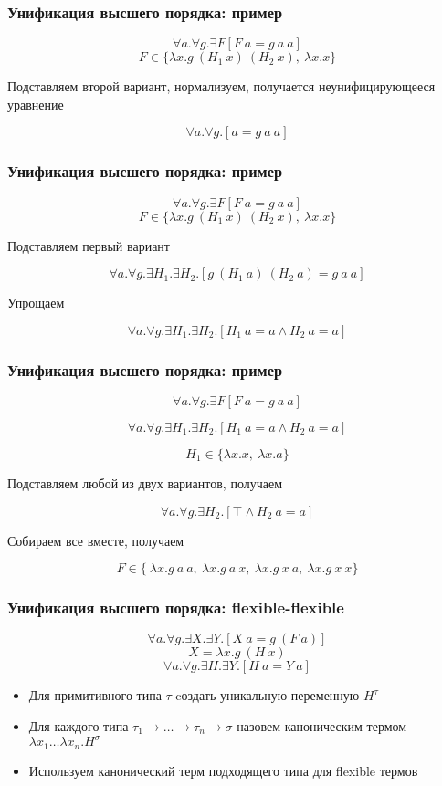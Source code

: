 \documentclass{beamer}
\begin{document}
\begin{frame}[fragile]
  \frametitle{Унификация высшего порядка: пример}
\[ \forall a. \forall g. \exists F [F \ a = g \ a \ a] \]
\[ F \in \{ \lambda x. g \ (H_1 \ x) \ (H_2 \ x), \  \lambda x. x \} \]
\begin{center}
  Подставляем второй вариант, нормализуем, получается неунифицирующееся уравнение
\end{center}
\[\forall a. \forall g. [a = g \ a \ a ]\]
\end{frame}

\begin{frame}[fragile]
  \frametitle{Унификация высшего порядка: пример}
\[ \forall a. \forall g. \exists F [F \ a = g \ a \ a] \]
\[ F \in \{ \lambda x. g \ (H_1 \ x) \ (H_2 \ x), \  \lambda x. x \} \]
\begin{center}
  Подставляем первый вариант
\end{center}
\[ \forall a. \forall g. \exists H_1. \exists H_2. [g \ (H_1 \ a) \ (H_2 \ a) = g \ a \ a]\]
\begin{center}
  Упрощаем
\end{center}
\[ \forall a. \forall g. \exists H_1. \exists H_2. [H_1 \ a = a \wedge H_2 \ a = a] \]
\end{frame}

\begin{frame}[fragile]
  \frametitle{Унификация высшего порядка: пример}
\[ \forall a. \forall g. \exists F [F \ a = g \ a \ a] \]

\[ \forall a. \forall g. \exists H_1. \exists H_2. [H_1 \ a = a \wedge H_2 \ a = a] \]

\[ H_1 \in \{ \lambda x. x, \ \lambda x. a \}\]
\begin{center}
  Подставляем любой из двух вариантов, получаем
\end{center}
\[\forall a. \forall g. \exists H_2. [\top \wedge H_2 \ a = a]\]


\begin{center}
  Собираем все вместе, получаем
\end{center}
\[F \in \{\ \lambda x. g \ a \ a, \ \lambda x. g \ a \ x, \ \lambda x. g \ x \ a, \ \lambda x. g \ x \ x \}\]

\end{frame}


\begin{frame}[fragile]
  \frametitle{Унификация высшего порядка: flexible-flexible}
\[ \forall a . \forall g. \exists X. \exists Y. [X \ a = g \ (F \ a) ]\]
\[ X = \lambda x. g \ (H \ x)\]
\[ \forall a. \forall g. \exists H. \exists Y. [H \ a = Y \ a] \]

\begin{itemize}
  \item Для примитивного типа $\tau$ cоздать уникальную переменную $H^{\tau}$
  \item Для каждого типа $\tau_1 \to \dots \to \tau_n \to \sigma$ назовем каноническим термом $\lambda x_1 \dots \lambda x_n. H^{\sigma}$
  \item Используем канонический терм подходящего типа для flexible термов
\end{itemize}

\end{frame}
\end{document}
